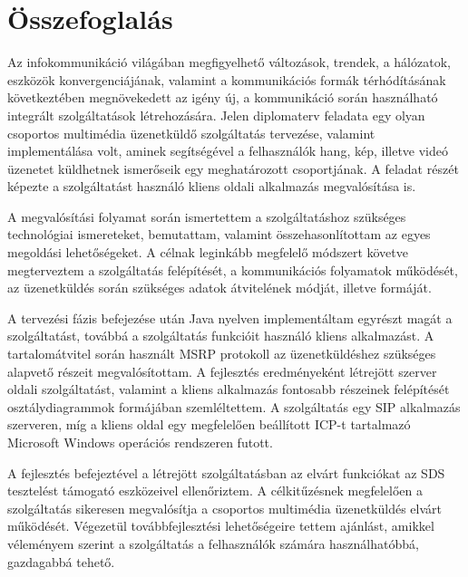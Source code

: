 
\section{Összefoglalás}
\label{sec:osszefoglalas}

Az infokommunikáció világában megfigyelhető változások, trendek, a hálózatok, eszközök konvergenciájának, valamint a kommunikációs formák térhódításának következtében megnövekedett az igény új, a kommunikáció során használható integrált szolgáltatások létrehozására. Jelen diplomaterv feladata egy olyan csoportos multimédia üzenetküldő szolgáltatás tervezése, valamint implementálása volt, aminek segítségével a felhasználók hang, kép, illetve videó üzenetet küldhetnek ismerőseik egy meghatározott csoportjának. A feladat részét képezte a szolgáltatást használó kliens oldali alkalmazás megvalósítása is.

A megvalósítási folyamat során ismertettem a szolgáltatáshoz szükséges technológiai ismereteket, bemutattam, valamint összehasonlítottam az egyes megoldási lehetőségeket. A célnak leginkább megfelelő módszert követve megterveztem a szolgáltatás felépítését, a kommunikációs folyamatok működését, az üzenetküldés során szükséges adatok átvitelének módját, illetve formáját. 

A tervezési fázis befejezése után Java nyelven implementáltam egyrészt magát a szolgáltatást, továbbá a szolgáltatás funkcióit használó kliens alkalmazást. A tartalomátvitel során használt MSRP protokoll az üzenetküldéshez szükséges alapvető részeit megvalósítottam. A fejlesztés eredményeként létrejött szerver oldali szolgáltatást, valamint a kliens alkalmazás fontosabb részeinek felépítését osztálydiagrammok formájában szemléltettem. A szolgáltatás egy SIP alkalmazás szerveren, míg a kliens oldal egy megfelelően beállított ICP-t tartalmazó Microsoft Windows operációs rendszeren futott.

A fejlesztés befejeztével a létrejött szolgáltatásban az elvárt funkciókat az SDS tesztelést támogató eszközeivel ellenőriztem. A célkitűzésnek megfelelően a szolgáltatás sikeresen megvalósítja a csoportos multimédia üzenetküldés elvárt működését. Végezetül továbbfejlesztési lehetőségeire tettem ajánlást, amikkel véleményem szerint a szolgáltatás a felhasználók számára használhatóbbá, gazdagabbá tehető.